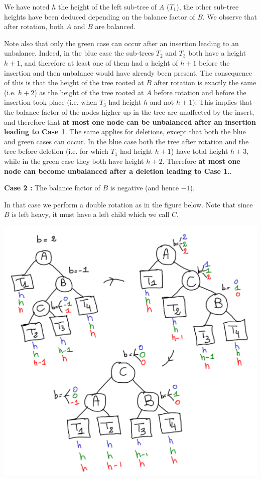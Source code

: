 \documentclass[12pt]{article}
\theoremstyle{plain}
\theoremstyle{remark}
\begin{document}
We have noted $h$ the height of the left sub-tree of $A$ ($T_1$), the other
sub-tree heights have been deduced depending on the balance factor of $B$. 
We observe that after rotation, both $A$ and $B$ are balanced. 

Note also that only the green case can occur after an insertion leading to an
unbalance. Indeed, in the blue case the sub-trees $T_2$ and $T_3$ both have a
height $h+1$, and therefore at least one of them had a height of $h+1$ before
the insertion and then unbalance would have already been present. The
consequence of this is that the height of the tree rooted  at $B$
after rotation is exactly the same (i.e. $h+2$) as the height of the tree
rooted at $A$ before rotation and before the insertion took place 
(i.e. when $T_3$ had height $h$ and not $h+1$). This implies that the balance
factor of the nodes higher up in the tree are unaffected by the insert, and
therefore that {\bf at most one node can be unbalanced after an insertion
leading to Case 1}.
The same applies for deletions, except that both the blue and green cases can
occur. In the blue case both the tree after rotation and the tree before deletion 
(i.e. for which $T_1$ had height $h+1$) have total height $h+3$, while in the
green case they both have height $h+2$. Therefore {\bf at most one node can become 
unbalanced after a deletion leading to Case 1.}.

\medskip

{\bf Case 2 :} The balance factor of $B$ is negative (and hence $-1$).


In that case we perform a double rotation as in the figure below. Note that
since $B$ is left heavy, it must have a left child which we call $C$.


\begin{center}
	\includegraphics[width=14cm]{data/rebalance_double.pdf}
\end{center}
\end{document}
